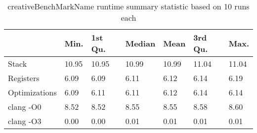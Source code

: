\begin{table}[h!]
\centering
\begin{tabular}{p{}p{}p{}p{}p{}p{}p{}}
  \hline
 & Min. & 1st Qu. & Median & Mean & 3rd Qu. & Max. \\ 
  \hline
Stack & 10.95 & 10.95 & 10.99 & 10.99 & 11.04 & 11.04 \\ 
  Registers & 6.09 & 6.09 & 6.11 & 6.12 & 6.14 & 6.19 \\ 
  Optimizations & 6.09 & 6.11 & 6.11 & 6.12 & 6.14 & 6.14 \\ 
  clang -O0 & 8.52 & 8.52 & 8.55 & 8.55 & 8.58 & 8.60 \\ 
  clang -O3 & 0.00 & 0.00 & 0.01 & 0.01 & 0.01 & 0.01 \\ 
   \hline
\end{tabular}
\caption{creativeBenchMarkName runtime summary statistic based on 10 runs each}
\end{table}
